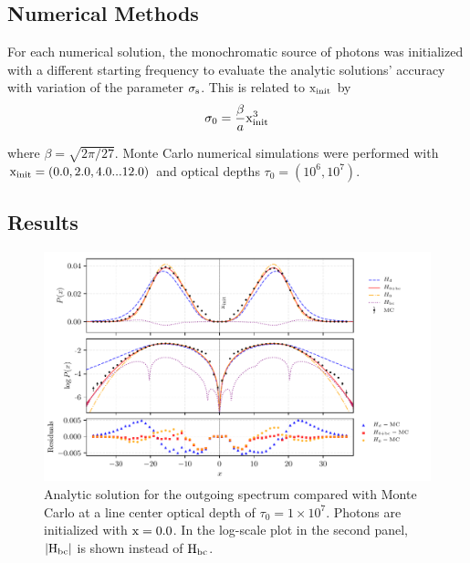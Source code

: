 \documentclass{aastex63}
\begin{document}
\subsection{Numerical Methods}
\label{subsec:no_destruction:methods}
For each numerical solution, the monochromatic source of photons was initialized with a different starting frequency to evaluate the analytic solutions' accuracy with variation of the parameter $\rm \sigma_s$. This is related to $\rm x_{init}$ by 
\begin{equation} \label{sigma0_xinit}
    \sigma_0 = \frac{\beta}{a} \rm x_{init}^3
\end{equation}

where $\beta = \sqrt{2 \pi / 27}$. Monte Carlo numerical simulations were performed with $\rm x_{init} = (0.0, 2.0, 4.0 ... 12.0)$ and optical depths $\tau_0 = (10^6, 10^7)$.



\subsection{Results}
\label{subsec:no_destruction:results}
\begin{figure}
    \centering
    \includegraphics{pdf_xinit0.0.pdf}
    \caption{Analytic solution for the outgoing spectrum compared with Monte Carlo at a line center optical depth of $\tau_0 = 1 \times 10^7$. Photons are initialized with $\rm x = 0.0$. In the log-scale plot in the second panel, $|\rm H_{bc}|$ is shown instead of $\rm H_{bc}$.} 
    \label{fig:sol_mc_residual_0}
\end{figure}
\end{document}
